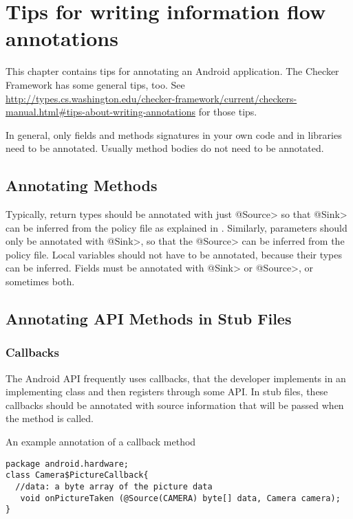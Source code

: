 \htmlhr
\chapter{Tips for writing information flow annotations\label{app-annotation}}

This chapter contains tips for annotating an Android application.  The Checker
Framework has some general tips, too.  See \url{http://types.cs.washington.edu/checker-framework/current/checkers-manual.html#tips-about-writing-annotations} for those tips.

In general, only fields and methods signatures in your own code and in
libraries need to be annotated. Usually method bodies do not need to be
annotated.


\section{Annotating  Methods\label{sec:annomethods}}

Typically, return types should be annotated with just \<@Source> so that \<@Sink> can be
 inferred from the policy file as explained in . Similarly, parameters should
  only be annotated with  \<@Sink>, so that the \<@Source> can be inferred from  the policy file.
    Local variables should not have to be annotated, because their types can be inferred. Fields 
    must be annotated with   \<@Sink> or \<@Source>, or sometimes both. 

\section{Annotating API Methods in Stub Files\label{sec:annoAPI}}

\subsection{Callbacks}
The Android API frequently uses callbacks, that the developer  
implements in an implementing class  and then registers through some API.
 In stub files, these callbacks should be annotated
with source information that will be passed when the method is called.  

An example annotation of a callback method
\begin{Verbatim}
package android.hardware;
class Camera$PictureCallback{
  //data: a byte array of the picture data
   void onPictureTaken (@Source(CAMERA) byte[] data, Camera camera);
}
\end{Verbatim}


